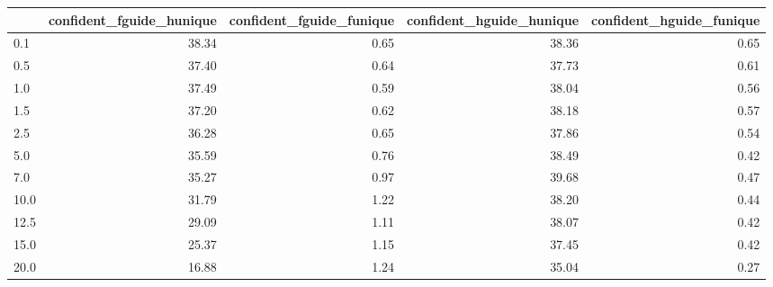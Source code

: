 \begin{tabular}{lrrrr}
\toprule
 & confident_fguide_hunique & confident_fguide_funique & confident_hguide_hunique & confident_hguide_funique \\
\midrule
0.1 & 38.34 & 0.65 & 38.36 & 0.65 \\
0.5 & 37.40 & 0.64 & 37.73 & 0.61 \\
1.0 & 37.49 & 0.59 & 38.04 & 0.56 \\
1.5 & 37.20 & 0.62 & 38.18 & 0.57 \\
2.5 & 36.28 & 0.65 & 37.86 & 0.54 \\
5.0 & 35.59 & 0.76 & 38.49 & 0.42 \\
7.0 & 35.27 & 0.97 & 39.68 & 0.47 \\
10.0 & 31.79 & 1.22 & 38.20 & 0.44 \\
12.5 & 29.09 & 1.11 & 38.07 & 0.42 \\
15.0 & 25.37 & 1.15 & 37.45 & 0.42 \\
20.0 & 16.88 & 1.24 & 35.04 & 0.27 \\
\bottomrule
\end{tabular}
